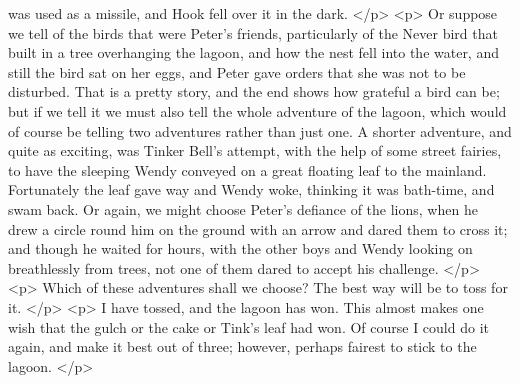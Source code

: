       was used as a missile, and Hook fell over it in the dark.
    </p>
    <p>
      Or suppose we tell of the birds that were Peter's friends, particularly of
      the Never bird that built in a tree overhanging the lagoon, and how the
      nest fell into the water, and still the bird sat on her eggs, and Peter
      gave orders that she was not to be disturbed. That is a pretty story, and
      the end shows how grateful a bird can be; but if we tell it we must also
      tell the whole adventure of the lagoon, which would of course be telling
      two adventures rather than just one. A shorter adventure, and quite as
      exciting, was Tinker Bell's attempt, with the help of some street fairies,
      to have the sleeping Wendy conveyed on a great floating leaf to the
      mainland. Fortunately the leaf gave way and Wendy woke, thinking it was
      bath-time, and swam back. Or again, we might choose Peter's defiance of
      the lions, when he drew a circle round him on the ground with an arrow and
      dared them to cross it; and though he waited for hours, with the other
      boys and Wendy looking on breathlessly from trees, not one of them dared
      to accept his challenge.
    </p>
    <p>
      Which of these adventures shall we choose? The best way will be to toss
      for it.
    </p>
    <p>
      I have tossed, and the lagoon has won. This almost makes one wish that the
      gulch or the cake or Tink's leaf had won. Of course I could do it again,
      and make it best out of three; however, perhaps fairest to stick to the
      lagoon.
    </p>
